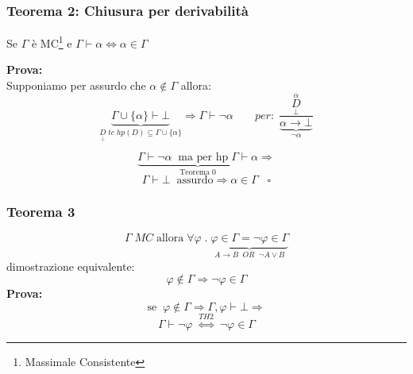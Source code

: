 \documentclass{article}
\theoremstyle{break}
\theoremstyle{break}
\theoremstyle{break}
\theoremstyle{break}
\begin{document}
\subsubsection{Teorema 2: Chiusura per derivabilità}
Se \( \Gamma \) è MC\footnote{Massimale Consistente} e \( \Gamma \vdash \alpha \Leftrightarrow \alpha \in \Gamma\) 


\textbf{Prova:}\\
Supponiamo per assurdo che \( \alpha \notin \Gamma \) allora:
\[ \underbrace{\Gamma \cup \{\alpha\} \vdash \bot}_{\underset{\bot}{D}\;tc\; hp(D) \subseteq \Gamma \cup \{\alpha\} } \Rightarrow \Gamma \vdash \neg \alpha \;\;\;\;\;\;\;per:\; \frac{\underset{\bot}{\stackrel{\alpha}{D}}}{\underbrace{\alpha \to \bot}_{\neg \alpha}} \] 

\[
  \underbrace{\Gamma \vdash \neg \alpha \;\; \text{ma per hp}\; \Gamma \vdash \alpha}_{\text{Teorema 0}} \Rightarrow
\] 
\[
\Gamma \vdash \bot \;\; \text{assurdo} \Rightarrow \alpha \in \Gamma \;\;\; \square
\] 
\subsubsection{Teorema 3}
\[
  \Gamma\;MC\; \text{allora}\; \forall \varphi\;.\; \underbrace{\varphi \in \Gamma = \neg \varphi \in \Gamma}_{A \to B\;\;OR\;\; \neg A \vee B}
\]  
dimostrazione equivalente:
\[
\varphi \notin \Gamma \Rightarrow \neg \varphi \in \Gamma
\] 
\textbf{Prova:}
\[
\text{se}\;\; \varphi \notin \Gamma \Rightarrow \Gamma, \varphi \vdash \bot \Rightarrow
\] 
\[
  \Gamma \vdash \neg \varphi\; \stackrel{TH2}{\Leftrightarrow}\; \neg \varphi \in \Gamma
\] 
\end{document}
